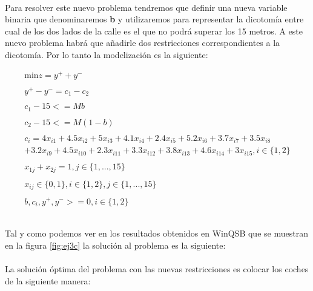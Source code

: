 \documentclass[10pt, a4paper]{article}
\begin{document}
			\paragraph{}
			Para resolver este nuevo problema tendremos que definir una nueva variable binaria que denominaremos \textbf{b} y utilizaremos para representar la dicotomía entre cual de los dos lados de la calle es el que no podrá superar los 15 metros. A este nuevo problema habrá que añadirle dos restricciones correspondientes a la dicotomía. Por lo tanto la modelización es la siguiente:

			\[
				\begin{split}
					\text{min} z = y^{+} + y^{-} \\ \\
						y^{+} - y^{-} = c_1 - c_2 \\ \\
						c_1 - 15 <= Mb \\ \\
						c_2 - 15 <= M(1-b) \\ \\
						c_i = 4x_{i1} + 4.5x_{i2} + 5x_{i3} + 4.1x_{i4} + 2.4x_{i5} + 5.2x_{i6} + 3.7x_{i7} + 3.5x_{i8} \\
						+ 3.2x_{i9} + 4.5x_{i10} + 2.3x_{i11} + 3.3x_{i12} + 3.8x_{i13} + 4.6x_{i14} + 3x_{i15}, i \in \{1,2\}\\ \\
						x_{1j} + x_{2j} = 1, j \in \{1,...,15\} \\ \\
						x_{ij} \in \{0,1\}, i \in \{1,2\},j \in \{1,...,15\} \\ \\
						b, c_{i}, y^{+}, y^{-} >= 0, i \in \{1,2\}\\ \\
				\end{split}
			\]

			\paragraph{}
			\paragraph{}
			Tal y como podemos ver en los resultados obtenidos en WinQSB que se muestran en la figura \ref{fig:ej3c} la solución al problema es la siguiente:
			\paragraph{}
			La solución óptima del problema con las nuevas restricciones es colocar los coches de la siguiente manera:
\end{document}
